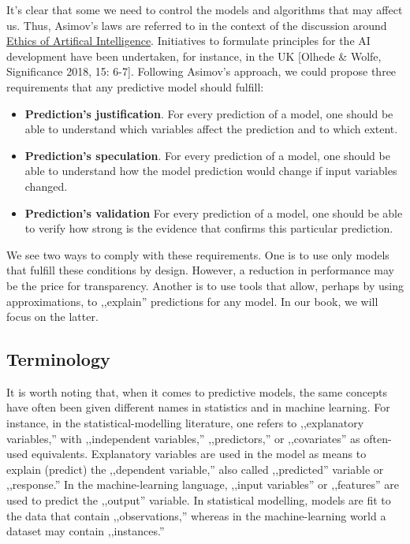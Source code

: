 \documentclass[]{krantz}
\providecommand{\tightlist}{%
  \setlength{\itemsep}{0pt}\setlength{\parskip}{0pt}}
\theoremstyle{definition}
\theoremstyle{definition}
\theoremstyle{definition}
\theoremstyle{remark}
\begin{document}
It's clear that some we need to control the models and algorithms that
may affect us. Thus, Asimov's laws are referred to in the context of the
discussion around
\href{https://en.wikipedia.org/wiki/Ethics_of_artificial_intelligence}{Ethics
of Artifical Intelligence}. Initiatives to formulate principles for the
AI development have been undertaken, for instance, in the UK {[}Olhede
\& Wolfe, Significance 2018, 15: 6-7{]}. Following Asimov's approach, we
could propose three requirements that any predictive model should
fulfill:

\begin{itemize}
\tightlist
\item
  \textbf{Prediction's justification}. For every prediction of a model,
  one should be able to understand which variables affect the prediction
  and to which extent.
\item
  \textbf{Prediction's speculation}. For every prediction of a model,
  one should be able to understand how the model prediction would change
  if input variables changed.
\item
  \textbf{Prediction's validation} For every prediction of a model, one
  should be able to verify how strong is the evidence that confirms this
  particular prediction.
\end{itemize}

We see two ways to comply with these requirements. One is to use only
models that fulfill these conditions by design. However, a reduction in
performance may be the price for transparency. Another is to use tools
that allow, perhaps by using approximations, to ,,explain'' predictions
for any model. In our book, we will focus on the latter.

\hypertarget{terminology}{%
\subsection{Terminology}\label{terminology}}

It is worth noting that, when it comes to predictive models, the same
concepts have often been given different names in statistics and in
machine learning. For instance, in the statistical-modelling literature,
one refers to ,,explanatory variables,'' with ,,independent variables,''
,,predictors,'' or ,,covariates'' as often-used equivalents. Explanatory
variables are used in the model as means to explain (predict) the
,,dependent variable,'' also called ,,predicted'' variable or
,,response.'' In the machine-learning language, ,,input variables'' or
,,features'' are used to predict the ,,output'' variable. In statistical
modelling, models are fit to the data that contain ,,observations,''
whereas in the machine-learning world a dataset may contain
,,instances.''
\end{document}
